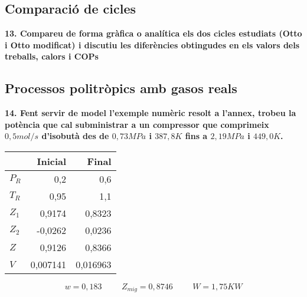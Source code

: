 \documentclass[a4paper]{article}
\begin{document}
\subsection*{Comparació de cicles}	

\textbf{13. Compareu de forma gràfica o analítica els dos cicles estudiats (Otto i Otto modificat) i discutiu les diferències obtingudes en els valors dels treballs, calors i COPs}

\begin{figure}[H]
    \centering
\end{figure}

\subsection*{Processos politròpics amb gasos reals}

\textbf{14. Fent servir de model l’exemple numèric resolt a l’annex, trobeu la potència que cal subministrar a un compressor que comprimeix $0,5 mol/s$ d’isobutà des de $0,73 MPa$ i $387,8 K$ fins a $2,19 MPa$ i $449,0 K$.}

\begin{center}
	\begin{tabular}{l|rr}
		& Inicial & Final \\
		\hline
		$P_R$ & 0,2 & 0,6 \\
		$T_R$ & 0,95 & 1,1 \\
		$Z_1$ & 0,9174 & 0,8323 \\
		$Z_2$ & -0,0262 & 0,0236 \\
		$Z$ & 0,9126 & 0,8366 \\
		$V$ & 0,007141 & 0,016963 \\
	\end{tabular}
\end{center}

$$ w = 0,183 \hspace{1cm} Z_{mig} = 0,8746 \hspace{1cm} W = 1,75KW $$
\end{document}
